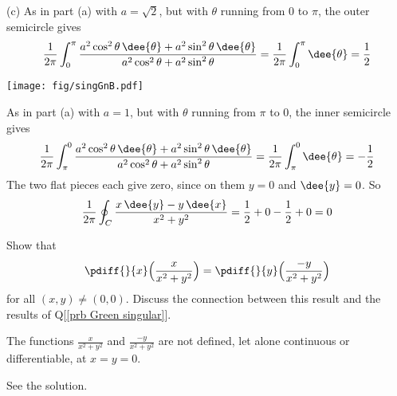 \begin{solution}
(c)
As in part (a) with $a=\sqrt{2}$, but with $\theta$ running from $0$ to $\pi$,
the outer semicircle gives
\begin{equation*}
\frac{1}{2\pi}\int_0^{\pi} \frac{a^2\cos^2\theta\,\dee{\theta}+a^2\sin^2\theta\,\dee{\theta}}
             {a^2\cos^2\theta+a^2\sin^2\theta}
=\frac{1}{2\pi}\int_0^{\pi}\dee{\theta}
=\frac{1}{2}
\end{equation*}
\begin{center}
       \texttt{[image: fig/singGnB.pdf]}
\end{center}
As in part (a) with $a=1$, but with $\theta$ running from $\pi$ to $0$,
the inner semicircle
gives
\begin{equation*}
\frac{1}{2\pi}\int^0_{\pi} \frac{a^2\cos^2\theta\,\dee{\theta}+a^2\sin^2\theta\,\dee{\theta}}
             {a^2\cos^2\theta+a^2\sin^2\theta}
=\frac{1}{2\pi}\int^0_{\pi}\dee{\theta}
=-\frac{1}{2}
\end{equation*}
The two flat pieces each give zero, since
on them $y=0$ and $\dee{y}=0$. So
\begin{equation*}
\frac{1}{2\pi}\oint_C \frac{x\,\dee{y}-y\,\dee{x}}{x^2+y^2}
=\frac{1}{2}+0-\frac{1}{2}+0=0
\end{equation*}


\end{solution}

\begin{question}
Show that
\begin{align*}
\pdiff{}{x}\Big( \frac{x}{x^2+y^2}\Big)
=\pdiff{}{y}\Big( \frac{-y}{x^2+y^2}\Big)
\end{align*}
for all $(x,y)\ne (0,0)$. Discuss the connection between this result and
the results of Q[\ref{prb Green singular}].
\end{question}

\begin{hint}
The functions $\frac{x}{x^2+y^2}$
and $\frac{-y}{x^2+y^2}$ are not defined, let alone continuous or
differentiable, at $x=y=0$.
\end{hint}

\begin{answer}
See the solution.
\end{answer}

